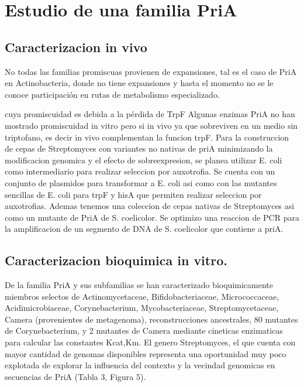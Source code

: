 \documentclass[12pt,twoside]{reedthesis}
\begin{document}
  \section{Estudio de una familia PriA}\label{estudio-de-una-familia-pria}
  
  \subsection{Caracterizacion in vivo}\label{caracterizacion-in-vivo}
  
  No todas las familias promiscuas provienen de expansiones, tal es el
  caso de PriA en Actinobacteria, donde no tiene expansiones y hasta el
  momento no se le conoce participación en rutas de metabolismo
  especializado.
  
  cuya promiscuidad es debida a la pérdida de TrpF Algunas enzimas PriA no
  han mostrado promiscuidad in vitro pero si in vivo ya que sobreviven en
  un medio sin triptofano, es decir in vivo complementan la funcion trpF.
  Para la construccion de cepas de Streptomyces con variantes no nativas
  de priA minimizando la modificacion genomica y el efecto de
  sobreexpresion, se planea utilizar E. coli como intermediario para
  realizar seleccion por auxotrofia. Se cuenta con un conjunto de
  plasmidos para transformar a E. coli asi como con las mutantes sencillas
  de E. coli para trpF y hisA que permiten realizar seleccion por
  auxotrofias. Ademas tenemos una coleccion de cepas nativas de
  Streptomyces asi como un mutante de PriA de S. coelicolor. Se optimizo
  una reaccion de PCR para la amplificacion de un segmento de DNA de S.
  coelicolor que contiene a priA.
  
  \subsection{Caracterizacion bioquimica in
  vitro.}\label{caracterizacion-bioquimica-in-vitro.}
  
  De la familia PriA y sus subfamilias se han caracterizado
  bioquimicamente miembros selectos de Actinomycetaceae,
  Bifidobacteriaceae, Micrococcaceae, Acidimicrobiaceae, Corynebacterium,
  Mycobacteriaceae, Streptomycetaceae, Camera (provenientes de
  metagenoma), reconstrucciones ancestrales, 80 mutantes de
  Corynebacterium, y 2 mutantes de Camera mediante cineticas enzimaticas
  para calcular las constantes Kcat,Km. El genero Streptomyces, el que
  cuenta con mayor cantidad de genomas disponibles representa una
  oportunidad muy poco explotada de explorar la influencia del contexto y
  la vecindad genomicas en secuencias de PriA (Tabla 3, Figura 5).
  
\end{document}
